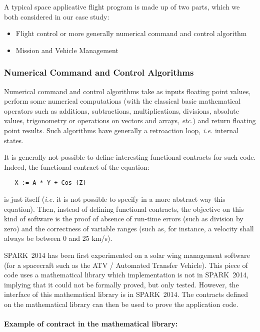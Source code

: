\documentclass[10pt,a4paper,twocolumn]{article}
\newcommand{\newspark}{SPARK~2014\xspace}
\newcommand{\etc}{\textit{etc.}\xspace}
\newcommand{\ie}{\textit{i.e.}\xspace}
\begin{document}
A typical space applicative flight program is made up of two parts, which we
both considered in our case study:

\begin{itemize}
\item Flight control or more generally numerical command and control algorithm
\item Mission and Vehicle Management
\end{itemize}

\subsubsection{Numerical Command and Control Algorithms}

Numerical command and control algorithms take as inputs floating point values,
perform some numerical computations (with the classical basic mathematical
operators such as additions, subtractions, multiplications, divisions, absolute
values, trigonometry or operations on vectors and arrays, \etc) and return
floating point results. Such algorithms have generally a retroaction loop, \ie
internal states.

It is generally not possible to define interesting functional contracts for
such code. Indeed, the functional contract of the equation:

\begin{lstlisting}
   X := A * Y + Cos (Z)
\end{lstlisting}

\noindent
is just itself (\ie it is not possible to specify in a more abstract way this
equation). Then, instead of defining functional contracts, the objective on
this kind of software is the proof of absence of run-time errors (such as
division by zero) and the correctness of variable ranges (such as, for
instance, a velocity shall always be between 0 and 25 km/s).

\newspark has been first experimented on a solar wing management software (for a spacecraft such as the ATV / Automated Transfer Vehicle).
This piece of code uses a mathematical library which implementation is not in \newspark, implying that it could not be formally proved, but only tested. However, the interface of this mathematical library is in \newspark. The contracts defined on the mathematical library can then be used to prove the application code.

\paragraph{Example of contract in the mathematical library:}
\end{document}
